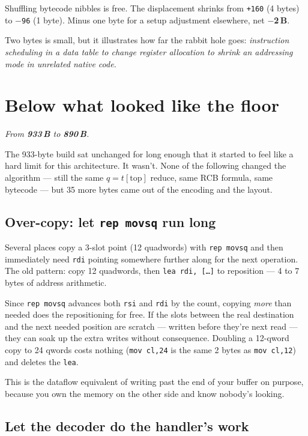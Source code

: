 \documentclass[11pt,a4paper]{article}
\newcommand{\bytes}[1]{\textcolor{blue!60!black}{\textbf{#1\,B}}}
\newcommand{\saved}[1]{\textcolor{green!50!black}{\textbf{$-$#1\,B}}}
\begin{document}
Shuffling bytecode nibbles is free. The displacement shrinks from
\texttt{+160} (4 bytes) to \texttt{$-$96} (1 byte). Minus one byte
for a setup adjustment elsewhere, net \saved{2}.

Two bytes is small, but it illustrates how far the rabbit hole goes:
\emph{instruction scheduling in a data table to change register
allocation to shrink an addressing mode in unrelated native code.}

\section{Below what looked like the floor}
\label{sec:below}

\noindent\emph{From \bytes{933} to \bytes{890}.}

The 933-byte build sat unchanged for long enough that it started to
feel like a hard limit for this architecture. It wasn't. None of the
following changed the algorithm --- still the same $q=t[\text{top}]$
reduce, same RCB formula, same bytecode --- but 35 more bytes came
out of the encoding and the layout.

\subsection{Over-copy: let \texttt{rep movsq} run long}

Several places copy a 3-slot point (12 quadwords) with \texttt{rep
movsq} and then immediately need \texttt{rdi} pointing somewhere
further along for the next operation. The old pattern: copy 12
quadwords, then \texttt{lea rdi, [\ldots]} to reposition --- 4 to 7
bytes of address arithmetic.

Since \texttt{rep movsq} advances both \texttt{rsi} and \texttt{rdi}
by the count, copying \emph{more} than needed does the repositioning
for free. If the slots between the real destination and the next
needed position are scratch --- written before they're next read ---
they can soak up the extra writes without consequence. Doubling a
12-qword copy to 24 qwords costs nothing (\texttt{mov cl,24} is the
same 2 bytes as \texttt{mov cl,12}) and deletes the \texttt{lea}.

This is the dataflow equivalent of writing past the end of your
buffer on purpose, because you own the memory on the other side and
know nobody's looking.

\subsection{Let the decoder do the handler's work}
\end{document}
